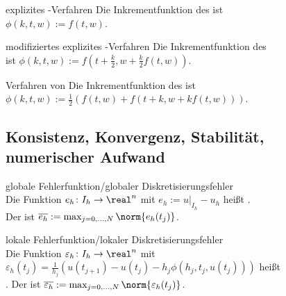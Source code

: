 \linie

\begin{Def}{explizites -Verfahren}
    Die Inkrementfunktion des
     ist\\
    $\phi(k, t, w) := f(t, w)$.
\end{Def}

\begin{Def}{modifiziertes explizites -Verfahren}
    Die Inkrementfunktion des\\
     ist
    $\phi(k, t, w) := f(t + \frac{k}{2}, w + \frac{k}{2} f(t, w))$.
\end{Def}

\begin{Def}{Verfahren von }
    Die Inkrementfunktion des  ist\\
    $\phi(k, t, w) := \frac{1}{2} (f(t, w) + f(t + k, w + k f(t, w)))$.
\end{Def}

\pagebreak

\subsection{%
    Konsistenz, Konvergenz, Stabilität, numerischer Aufwand%
}

\begin{Def}{globale Fehlerfunktion/globaler Diskretisierungsfehler}\\
    Die Funktion $e_h\colon I_h \rightarrow \real^n$ mit
    $e_h := u|_{I_h} - u_h$ heißt .\\
    Der  ist
    $\overline{e_h} := \max_{j=0,\dotsc,N} \norm{e_h(t_j)}$.
\end{Def}

\begin{Def}{lokale Fehlerfunktion/lokaler Diskretisierungsfehler}\\
    Die Funktion $\varepsilon_h\colon I_h \rightarrow \real^n$ mit
    $\varepsilon_h(t_j) = \frac{1}{h_j}
    (u(t_{j+1}) - u(t_j) - h_j \phi(h_j, t_j, u(t_j)))$ heißt\\
    .
    Der  ist
    $\overline{\varepsilon_h} :=
    \max_{j=0,\dotsc,N} \norm{\varepsilon_h(t_j)}$.
\end{Def}


